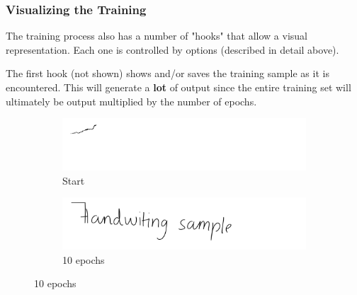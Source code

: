 \documentclass{article}
\begin{document}
\subsubsection{Visualizing the Training}
The training process also has a number of "hooks" that allow a visual representation. Each one is controlled by options (described in detail above).

The first hook (not shown) shows and/or saves the training sample as it is encountered. This will generate a \textbf{lot} of output since the entire training set will ultimately be output multiplied by the number of epochs.

\begin{figure}[hbt!]
     \centering
     \begin{subfigure}[b]{0.49\textwidth}
         \centering
         \includegraphics[width=\textwidth]{gen_stroke_samples_2}
         \caption{Start}
         \label{fig:training_strokes:a}
     \end{subfigure}
     \hfill
     \begin{subfigure}[b]{0.49\textwidth}
         \centering
         \includegraphics[width=\textwidth]{gen_stroke_samples_100}
         \caption{10 epochs}
         \label{fig:training_strokes:b}
     \end{subfigure}
     \newline
     

\end{figure}
\end{document}
